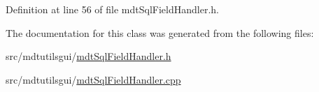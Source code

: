 Definition at line 56 of file mdt\-Sql\-Field\-Handler.\-h.



The documentation for this class was generated from the following files\-:\begin{DoxyCompactItemize}
\item 
src/mdtutilsgui/\hyperlink{mdt_sql_field_handler_8h}{mdt\-Sql\-Field\-Handler.\-h}\item 
src/mdtutilsgui/\hyperlink{mdt_sql_field_handler_8cpp}{mdt\-Sql\-Field\-Handler.\-cpp}\end{DoxyCompactItemize}
